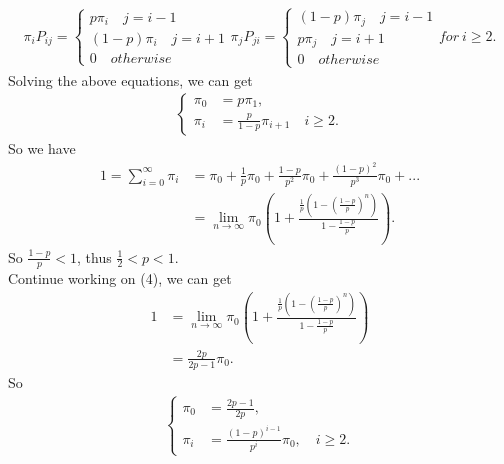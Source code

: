 \documentclass{article}
\begin{document}
\begin{align*}
    \pi_i P_{ij} = 
    \begin{cases}
    p\pi_i \quad j=i-1 \\
    (1-p)\pi_i \quad j=i+1 \\
    0 \quad otherwise
    \end{cases}
    \pi_j P_{ji} = 
    \begin{cases}
    (1-p)\pi_j \quad j=i-1 \\
    p\pi_j \quad j=i+1 \\
    0 \quad otherwise 
    \end{cases}
    for\ i \geq 2.
\end{align*}
Solving the above equations, we can get
\begin{align*}
    \begin{cases}
    \pi_0 &= p\pi_1, \\
    \pi_i &= \frac{p}{1-p}\pi_{i+1} \quad i \geq 2.
    \end{cases}
\end{align*}
So we have
\begin{align}
    1=\sum_{i=0}^\infty \pi_i &= \pi_0 + \frac{1}{p}\pi_0+\frac{1-p}{p^2}\pi_0 + \frac{(1-p)^2}{p^3}\pi_0 + ...\\
    &=\lim\limits_{n\to\infty}\pi_0(1+\frac{\frac{1}{p}(1-(\frac{1-p}{p})^n)}{1-\frac{1-p}{p}}).
\end{align}
So $\frac{1-p}{p}<1$, thus $\frac{1}{2}<p<1$.\\
Continue working on (4), we can get
\begin{align*}
    1&=\lim\limits_{n\to\infty}\pi_0(1+\frac{\frac{1}{p}(1-(\frac{1-p}{p})^n)}{1-\frac{1-p}{p}}) \\
    &= \frac{2p}{2p-1}\pi_0.
\end{align*}
So
\begin{align*}
    \begin{cases}
    \pi_0&=\frac{2p-1}{2p},\\
    \pi_i &= \frac{(1-p)^{i-1}}{p^i}\pi_0,\quad i\geq 2.
    \end{cases}
\end{align*}
\end{document}
